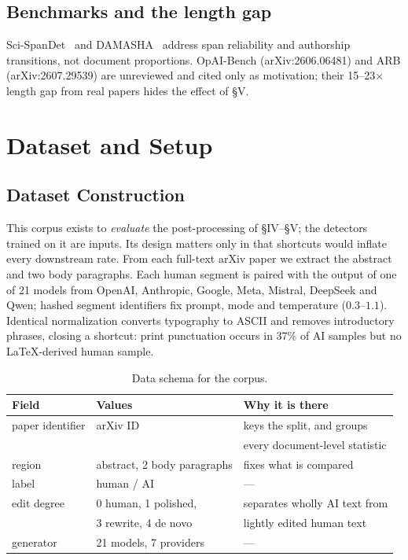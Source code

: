 \documentclass[10pt,conference,a4paper]{IEEEtran}
\newcommand{\sect}[1]{\S#1}
\begin{document}
\subsection{Benchmarks and the length gap}
Sci-SpanDet~\cite{scispandet2026} and DAMASHA~\cite{damasha2026} address span reliability
and authorship transitions, not document proportions. OpAI-Bench (arXiv:2606.06481) and
ARB (arXiv:2607.29539) are unreviewed and cited only as motivation; their 15--23$\times$ length gap from real
papers hides the effect of \sect{V}.

\section{Dataset and Setup}

\subsection{Dataset Construction}
This corpus exists to \emph{evaluate} the post-processing of \sect{IV}--\sect{V}; the
detectors trained on it are inputs. Its design matters only in that shortcuts would
inflate every downstream rate.
From each full-text arXiv paper we extract the abstract and two body paragraphs. Each
human segment is paired with the output of one of 21 models from OpenAI, Anthropic,
Google, Meta, Mistral, DeepSeek and Qwen; hashed segment identifiers fix prompt, mode and
temperature ($0.3$--$1.1$). Identical normalization converts typography to ASCII and
removes introductory phrases, closing a shortcut: print punctuation occurs in 37\% of
AI samples but no LaTeX-derived human sample.

\begin{table}[t]
\caption{Data schema for the corpus.}
\label{tab:fields}
\centering
\scriptsize
\setlength{\tabcolsep}{2.5pt}
\begin{tabular}{@{}lll@{}}
\toprule
Field & Values & Why it is there \\
\midrule
paper identifier & arXiv ID & keys the split, and groups \\
                 &          & every document-level statistic \\
region           & abstract, 2 body paragraphs & fixes what is compared \\
label            & human / AI & --- \\
edit degree      & 0 human, 1 polished, & separates wholly AI text from \\
                 & 3 rewrite, 4 de novo & lightly edited human text \\
generator        & 21 models, 7 providers & --- \\
\bottomrule
\end{tabular}
\end{table}
\end{document}
